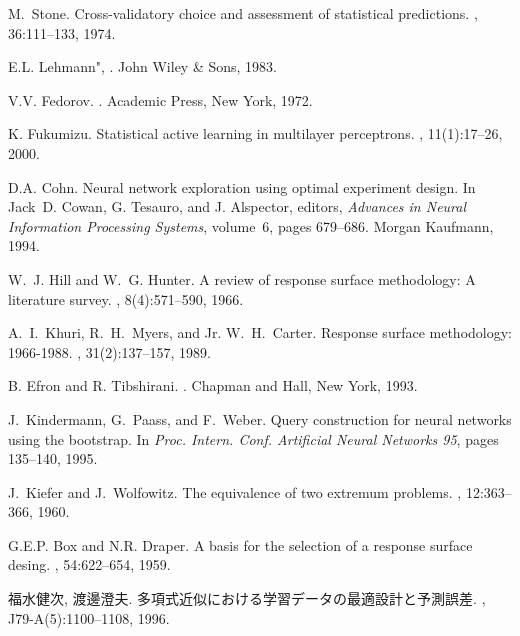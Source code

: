 \documentclass[master]{cimt}
\begin{document}
\begin{thebibliography}{10}

M.~Stone.
\newblock Cross-validatory choice and assessment of statistical predictions.
, 36:111--133, 1974.

E.L. Lehmann",
.
\newblock John Wiley \& Sons, 1983.


V.V. Fedorov.
.
\newblock Academic Press, New York, 1972.

K. Fukumizu.
\newblock Statistical active learning in multilayer perceptrons.
, 11(1):17--26, 2000.

D.A. Cohn.
\newblock Neural network exploration using optimal experiment design.
\newblock In Jack~D. Cowan, G. Tesauro, and J. Alspector, editors, {\em
  Advances in Neural Information Processing Systems}, volume~6, pages 679--686.
  Morgan Kaufmann, 1994.

W.~J. Hill and W.~G. Hunter.
\newblock A review of response surface methodology: A literature survey.
, 8(4):571--590, 1966.

A.~I.~Khuri, R.~H.~Myers, and Jr. W.~H.~Carter.
\newblock Response surface methodology: 1966-1988.
, 31(2):137--157, 1989.

B. Efron and R. Tibshirani.
.
\newblock Chapman and Hall, New York, 1993.

J.~Kindermann, G.~Paass, and F.~Weber.
\newblock Query construction for neural networks using the bootstrap.
\newblock In {\em Proc. Intern. Conf. Artificial Neural
  Networks 95}, pages 135--140, 1995.

J.~Kiefer and J.~Wolfowitz.
\newblock The equivalence of two extremum problems.
, 12:363--366, 1960.

G.E.P. Box and N.R. Draper.
\newblock A basis for the selection of a response surface desing. 
, 54:622--654, 1959.

福水健次, 渡邊澄夫.
\newblock 多項式近似における学習データの最適設計と予測誤差.
, J79-A(5):1100--1108, 1996.


\end{thebibliography}
\end{document}
